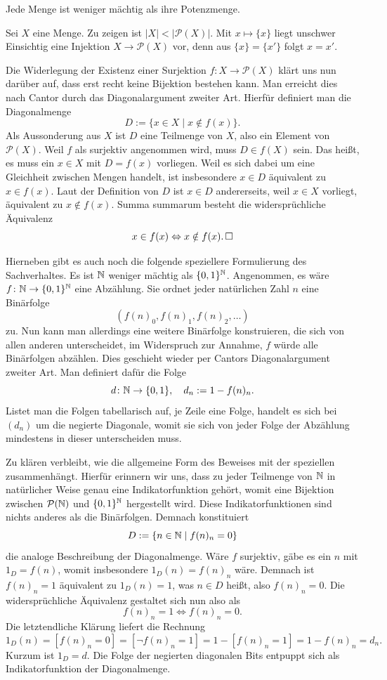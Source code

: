 \begin{Satz}\newlinefirst
Jede Menge ist weniger mächtig als ihre Potenzmenge.
\end{Satz}
\begin{Beweis}
Sei $X$ eine Menge. Zu zeigen ist $|X| < |\mathcal P(X)|$. Mit
$x\mapsto\{x\}$ liegt unschwer Einsichtig eine Injektion
$X\to\mathcal P(X)$ vor, denn aus $\{x\}=\{x'\}$ folgt $x=x'$.

Die Widerlegung der Existenz einer Surjektion $f\colon X\to\mathcal P(X)$
klärt uns nun darüber auf, dass erst recht keine Bijektion bestehen kann.
Man erreicht dies nach Cantor durch das Diagonalargument zweiter Art.
Hierfür definiert man die Diagonalmenge
\[D := \{x\in X\mid x\notin f(x)\}.\]
Als Aussonderung aus $X$ ist $D$ eine Teilmenge von $X$, also ein Element
von $\mathcal P(X)$. Weil $f$ als surjektiv angenommen wird, muss
$D\in f(X)$ sein. Das heißt, es muss ein $x\in X$ mit $D=f(x)$
vorliegen. Weil es sich dabei um eine Gleichheit zwischen Mengen handelt,
ist insbesondere $x\in D$ äquivalent zu $x\in f(x)$. Laut der Definition
von $D$ ist $x\in D$ andererseits, weil $x\in X$ vorliegt, äquivalent
zu $x\notin f(x)$. Summa summarum besteht die widersprüchliche Äquivalenz
\[x\in f(x)\Leftrightarrow x\notin f(x).\,\Box\]
\end{Beweis}

\noindent
Hierneben gibt es auch noch die folgende speziellere Formulierung des
Sachverhaltes. Es ist $\mathbb N$ weniger mächtig als $\{0,1\}^\mathbb N$.
Angenommen, es wäre $f\colon\mathbb N\to\{0,1\}^\mathbb N$ eine Abzählung. Sie
ordnet jeder natürlichen Zahl $n$ eine Binärfolge
\[(f(n)_0, f(n)_1, f(n)_2, \ldots)\]
zu. Nun kann man allerdings eine weitere Binärfolge konstruieren, die
sich von allen anderen unterscheidet, im Widerspruch zur Annahme,
$f$ würde alle Binärfolgen abzählen. Dies geschieht wieder per
Cantors Diagonalargument zweiter Art. Man definiert dafür die Folge
\[d\colon\mathbb N\to\{0,1\},\quad d_n := 1 - f(n)_n.\]
Listet man die Folgen tabellarisch auf, je Zeile eine Folge, handelt es
sich bei $(d_n)$ um die negierte Diagonale, womit sie sich von jeder
Folge der Abzählung mindestens in dieser unterscheiden muss.

Zu klären verbleibt, wie die allgemeine Form des Beweises mit der
speziellen zusammenhängt. Hierfür erinnern wir uns, dass zu jeder
Teilmenge von $\mathbb N$ in natürlicher Weise genau eine Indikatorfunktion
gehört, womit eine Bijektion zwischen $\mathcal P(\mathbb N)$ und
$\{0,1\}^\mathbb N$ hergestellt wird. Diese Indikatorfunktionen sind nichts
anderes als die Binärfolgen. Demnach konstituiert
\[D := \{n\in\mathbb N\mid f(n)_n = 0\}\]
die analoge Beschreibung der Diagonalmenge. Wäre $f$ surjektiv, gäbe
es ein $n$ mit $1_D=f(n)$, womit insbesondere $1_D(n)=f(n)_n$ wäre.
Demnach ist $f(n)_n=1$ äquivalent zu $1_D(n)=1$, was $n\in D$ heißt,
also $f(n)_n=0$. Die widersprüchliche Äquivalenz gestaltet sich nun
also als
\[f(n)_n = 1\Leftrightarrow f(n)_n = 0.\]
Die letztendliche Klärung liefert die Rechnung
\[1_D(n) = [f(n)_n = 0] = [\lnot f(n)_n = 1] = 1 - [f(n)_n = 1]
= 1 - f(n)_n = d_n.\]
Kurzum ist $1_D=d$. Die Folge der negierten diagonalen Bits entpuppt
sich als Indikatorfunktion der Diagonalmenge.


